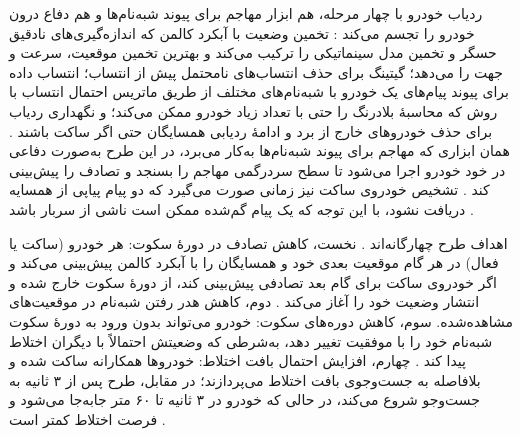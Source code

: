 \documentclass[12pt,a4paper]{article}
\begin{document}
ردیاب خودرو با چهار مرحله، هم ابزار مهاجم برای پیوند شبه‌نام‌ها و هم دفاع درون خودرو را تجسم می‌کند \cite{al-aniPrivacySafetyImprovement2023}: تخمین وضعیت با آبکرد کالمن که اندازه‌گیری‌های نادقیق حسگر و تخمین مدل سینماتیکی را ترکیب می‌کند و بهترین تخمین موقعیت، سرعت و جهت را می‌دهد؛ گیتینگ برای حذف انتساب‌های نامحتمل پیش از انتساب؛ انتساب داده برای پیوند پیام‌های یک خودرو با شبه‌نام‌های مختلف از طریق ماتریس احتمال انتساب با روش  که محاسبهٔ بلادرنگ را حتی با تعداد زیاد خودرو ممکن می‌کند؛ و نگهداری ردیاب برای حذف خودرو‌های خارج از برد و ادامهٔ ردیابی همسایگان حتی اگر ساکت باشند \cite{al-aniPrivacySafetyImprovement2023}. همان ابزاری که مهاجم برای پیوند شبه‌نام‌ها به‌کار می‌برد، در این طرح به‌صورت دفاعی در خود خودرو اجرا می‌شود تا سطح سردرگمی مهاجم را بسنجد و تصادف را پیش‌بینی کند \cite{al-aniPrivacySafetyImprovement2023}. تشخیص خودروی ساکت نیز زمانی صورت می‌گیرد که دو پیام پیاپی از همسایه دریافت نشود، با این توجه که یک پیام گم‌شده ممکن است ناشی از سربار باشد \cite{al-aniPrivacySafetyImprovement2023}.

اهداف طرح چهارگانه‌اند \cite{al-aniPrivacySafetyImprovement2023}. نخست، کاهش تصادف در دورهٔ سکوت: هر خودرو (ساکت یا فعال) در هر گام موقعیت بعدی خود و همسایگان را با آبکرد کالمن پیش‌بینی می‌کند و اگر خودروی ساکت برای گام بعد تصادفی پیش‌بینی کند، از دورهٔ سکوت خارج شده و انتشار وضعیت خود را آغاز می‌کند \cite{al-aniPrivacySafetyImprovement2023}. دوم، کاهش هدر رفتن شبه‌نام در موقعیت‌های مشاهده‌شده. سوم، کاهش دوره‌های سکوت: خودرو می‌تواند بدون ورود به دورهٔ سکوت شبه‌نام خود را با موفقیت تغییر دهد، به‌شرطی که وضعیتش احتمالاً با دیگران اختلاط پیدا کند \cite{al-aniPrivacySafetyImprovement2023}. چهارم، افزایش احتمال بافت اختلاط: خودرو‌ها همکارانه ساکت شده و بلافاصله به جست‌وجوی بافت اختلاط می‌پردازند؛ در مقابل، طرح  پس از ۳ ثانیه به جست‌وجو شروع می‌کند، در حالی که خودرو در ۳ ثانیه تا ۶۰ متر جابه‌جا می‌شود و فرصت اختلاط کمتر است \cite{al-aniPrivacySafetyImprovement2023}.
\end{document}
